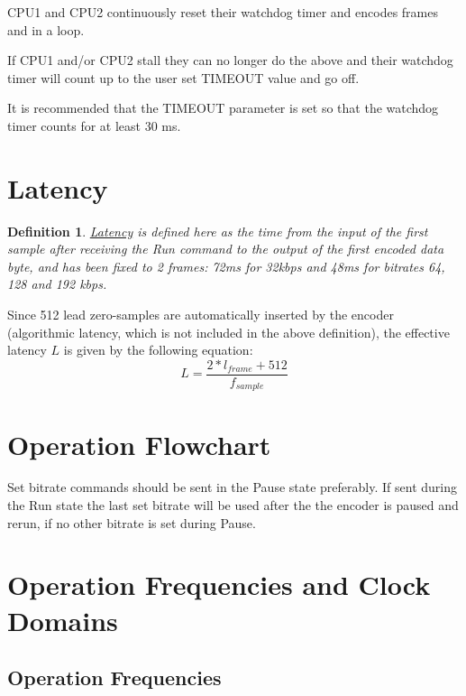 \documentclass{ug}
\theoremstyle{plain}
\newtheorem*{defn*}{Definition}
\begin{document}
CPU1 and CPU2 continuously reset their watchdog timer and encodes
frames and in a loop.

If CPU1 and/or CPU2 stall they can no longer do the above and their
watchdog timer will count up to the user set TIMEOUT value and go off.

It is recommended that the TIMEOUT parameter is set so that the
watchdog timer counts for at least 30 ms.


\section{Latency}
\label{sec:lat}

\begin{defn*}
  \underline{Latency} is defined here as the time from the input of the first sample
  after receiving the Run command to the output of the first encoded data byte,
  and has been fixed to 2 frames: 72ms for 32kbps and 48ms for bitrates 64, 128
  and 192 kbps.
\end{defn*}


Since 512 lead zero-samples are automatically inserted by the encoder
(algorithmic latency, which is not included in the above definition), the
effective latency $L$ is given by the following equation:
\begin{equation*}
  L = \frac{2*l_{frame} + 512}{f_{sample}}
\end{equation*}

\clearpage


\section{Operation Flowchart}
\label{sec:fchart}

Set bitrate commands should be sent in the Pause state preferably. If sent
during the Run state the last set bitrate will be used after the the encoder is
paused and rerun, if no other bitrate is set during Pause.






\section{Operation Frequencies and Clock Domains}

\subsection{Operation Frequencies}
\end{document}
